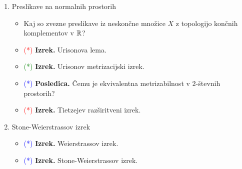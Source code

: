 \begin{enumerate}
    \item Preslikave na normalnih prostorih
    \begin{itemize}
        \item Kaj so zvezne preslikave iz neskončne množice \(X\) z topologijo končnih komplementov v \(\mathbb{R}\)?
        \item \textcolor{red}{(*)} \textbf{Izrek.} Urisonova lema.
        \item \textcolor{green}{(*)} \textbf{Izrek.} Urisonov metrizacijski izrek.
        \item \textcolor{blue}{(*)} \textbf{Posledica.} Čemu je ekvivalentna metrizabilnost v \(2\)-števnih prostorih?
        \item \textcolor{red}{(*)} \textbf{Izrek.} Tietzejev razširitveni izrek.
    \end{itemize}

    \item Stone-Weierstrassov izrek
    \begin{itemize}
        \item \textcolor{blue}{(*)} \textbf{Izrek.} Weierstrassov izrek.
        \item \textcolor{blue}{(*)} \textbf{Izrek.} Stone-Weierstrassov izrek.
    \end{itemize}
\end{enumerate}